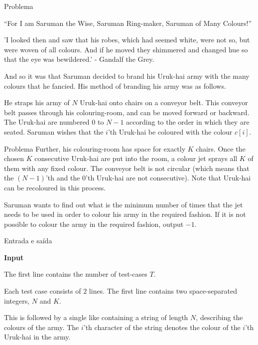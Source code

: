
\begin{frame}[fragile]{Problema}


``For I am Saruman the Wise, Saruman Ring-maker, Saruman of Many Colours!''

'I looked then and saw that his robes, which had seemed white, were not so, but were woven of all colours. And if he moved they shimmered and changed hue so that the eye was bewildered.' - Gandalf the Grey.

And so it was that Saruman decided to brand his Uruk-hai army with the many colours that he fancied. His method of branding his army was as follows.

He straps his army of $N$ Uruk-hai onto chairs on a conveyor belt. This conveyor belt passes through his colouring-room, and can be moved forward or backward. The Uruk-hai are numbered $0$ to $N-1$ according to the order in which they are seated. Saruman wishes that the $i$'th Uruk-hai be coloured with the colour $c[i]$.
\end{frame}

\begin{frame}[fragile]{Problema}
Further, his colouring-room has space for exactly $K$ chairs. Once the chosen $K$ consecutive Uruk-hai are put into the room, a colour jet sprays all $K$ of them with any fixed colour. The conveyor belt is not circular (which means that the $(N-1)$'th and the $0$'th Uruk-hai are not consecutive). Note that Uruk-hai can be recoloured in this process.

Saruman wants to find out what is the minimum number of times that the jet needs to be used in order to colour his army in the required fashion. If it is not possible to colour the army in the required fashion, output $-1$.
\end{frame}

\begin{frame}[fragile]{Entrada e saída}

\textbf{Input}

The first line contains the number of test-cases $T$.

Each test case consists of $2$ lines. The first line contains two space-separated integers, $N$ and $K$.

This is followed by a single like containing a string of length $N$, describing the colours of the army. The $i$'th character of the string denotes the colour of the $i$'th Uruk-hai in the army.
\end{frame}

